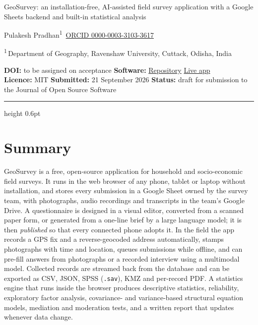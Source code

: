 \documentclass[10pt,a4paper,onecolumn]{article}
\begin{document}
{\sffamily\bfseries\LARGE\color{jossblue}\raggedright GeoSurvey: an
installation-free, AI-assisted field survey application with a Google
Sheets backend and built-in statistical analysis\par}
\vspace{0.9em}
{\large Pulakesh
Pradhan\textsuperscript{1}~\href{https://orcid.org/0000-0003-3103-3617}{\textcolor{jossblue}{\footnotesize\sffamily ORCID 0000-0003-3103-3617}}\par}
\vspace{0.35em}
{\small\color{muted}\textsuperscript{1}\,Department of Geography,
Ravenshaw University, Cuttack, Odisha, India\par}
\vspace{0.6em}
\begin{minipage}{\linewidth}\sffamily\footnotesize\color{muted}
\textbf{DOI:} to be assigned on acceptance \quad
\textbf{Software:} \href{https://github.com/pulakeshpradhan/geosurvey}{Repository} \textbullet{} \href{https://pulakeshpradhan.github.io/geosurvey/}{Live app}\\
\textbf{Licence:} MIT \quad \textbf{Submitted:} 21 September
2026 \quad \textbf{Status:} draft for submission to the Journal of Open Source Software
\end{minipage}
\vspace{0.4em}\hrule height 0.6pt \relax\vspace{0.9em}

\section{Summary}\label{summary}

GeoSurvey is a free, open-source application for household and
socio-economic field surveys. It runs in the web browser of any phone,
tablet or laptop without installation, and stores every submission in a
Google Sheet owned by the survey team, with photographs, audio
recordings and transcripts in the team's Google Drive. A questionnaire
is designed in a visual editor, converted from a scanned paper form, or
generated from a one-line brief by a large language model; it is then
\emph{published} so that every connected phone adopts it. In the field
the app records a GPS fix and a reverse-geocoded address automatically,
stamps photographs with time and location, queues submissions while
offline, and can pre-fill answers from photographs or a recorded
interview using a multimodal model. Collected records are streamed back
from the database and can be exported as CSV, JSON, SPSS
(\texttt{.sav}), KMZ and per-record PDF. A statistics engine that runs
inside the browser produces descriptive statistics, reliability,
exploratory factor analysis, covariance- and variance-based structural
equation models, mediation and moderation tests, and a written report
that updates whenever data change.
\end{document}
